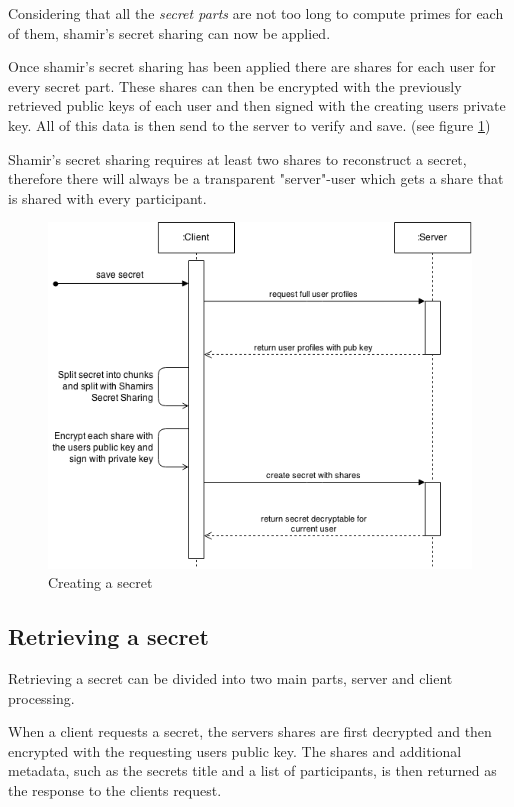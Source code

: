 Considering that all the \textit{secret parts} are not too long to compute
primes for each of them, shamir's secret sharing can now be applied.

Once shamir's secret sharing has been applied there are shares for each user
for every secret part. These shares can then be encrypted with the previously
retrieved public keys of each user and then signed with the creating users
private key. All of this data is then send to the server to verify and save.
(see figure \ref{fig:creating_a_secret})

Shamir's secret sharing requires at least two shares to reconstruct a secret,
therefore there will always be a transparent "server"-user which gets a share
that is shared with every participant.

\begin{figure}
  \includegraphics[scale=0.55]{pictures/create_secret_sequence_diagram.png}
  \caption{Creating a secret}
  \label{fig:creating_a_secret}
\end{figure}

\subsection{Retrieving a secret}

Retrieving a secret can be divided into two main parts, server and client
processing.

When a client requests a secret, the servers shares are first decrypted and
then encrypted with the requesting users public key. The shares and additional
metadata, such as the secrets title and a list of participants, is then
returned as the response to the clients request.

